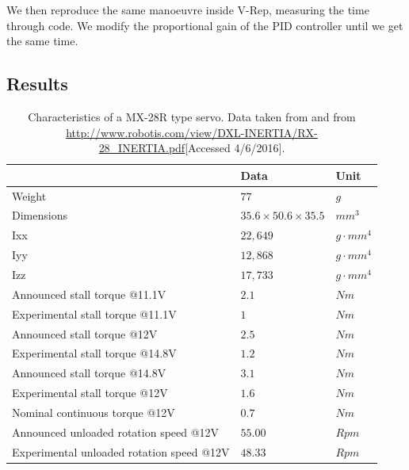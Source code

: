 We then reproduce the same manoeuvre inside V-Rep, measuring the time through code. We modify the proportional gain of the PID controller until we get the same time.



\subsection{Results}
\begin{table}[htp]
\begin{tabularx}{\textwidth}{@{} l X X @{}}
\toprule
& \textbf{Data} & \textbf{Unit}\\ 
\midrule
Weight & $77$ & $g$\\
Dimensions & $35.6 \times 50.6 \times 35.5$ & $mm^3$\\
Ixx & $22,649$ & $g \cdot mm^4$\\
Iyy & $12,868$ & $g \cdot mm^4$\\
Izz & $17,733$ & $g \cdot mm^4$ \\
Announced stall torque @11.1V & $2.1$ & $Nm$\\
Experimental stall torque @11.1V & $1$ & $Nm$\\
Announced stall torque @12V & $2.5$ & $Nm$\\
Experimental stall torque @14.8V & $1.2$ & $Nm$\\
Announced stall torque @14.8V & $3.1$ & $Nm$\\
Experimental stall torque @12V & $1.6$ & $Nm$\\
Nominal continuous torque @12V & $0.7$ & $Nm$\\
Announced unloaded rotation speed @12V & $55.00$ & $Rpm$\\
Experimental unloaded rotation speed @12V & $48.33$ & $Rpm$\\
\bottomrule
\end{tabularx}
\caption[]{Characteristics of a MX-28R type servo. Data taken from \cite{mx_28_manual} and from \url{http://www.robotis.com/view/DXL-INERTIA/RX-28_INERTIA.pdf}[Accessed 4/6/2016].}
\label{table:mx28-specs}
\end{table} 

